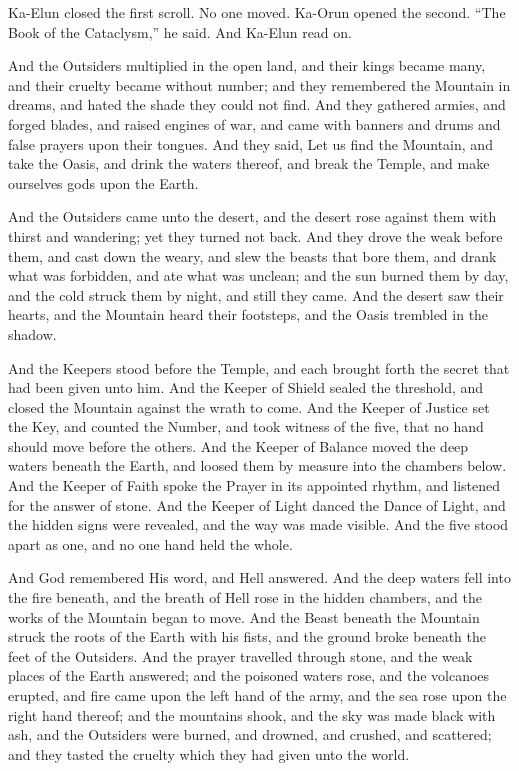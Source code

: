 Ka-Elun closed the first scroll. No one moved. Ka-Orun opened the second. ``The Book of the Cataclysm,'' he said. And Ka-Elun read on.\par
 
\begin{scripture}
And the Outsiders multiplied in the open land, and their kings became many, and their cruelty became without number; and they remembered the Mountain in dreams, and hated the shade they could not find.
And they gathered armies, and forged blades, and raised engines of war, and came with banners and drums and false prayers upon their tongues.
And they said, Let us find the Mountain, and take the Oasis, and drink the waters thereof, and break the Temple, and make ourselves gods upon the Earth.
\end{scripture}
 
\begin{scripture}
And the Outsiders came unto the desert, and the desert rose against them with thirst and wandering; yet they turned not back.
And they drove the weak before them, and cast down the weary, and slew the beasts that bore them, and drank what was forbidden, and ate what was unclean; and the sun burned them by day, and the cold struck them by night, and still they came.
And the desert saw their hearts, and the Mountain heard their footsteps, and the Oasis trembled in the shadow.
\end{scripture}
 
\begin{scripture}
And the Keepers stood before the Temple, and each brought forth the secret that had been given unto him.
And the Keeper of Shield sealed the threshold, and closed the Mountain against the wrath to come.
And the Keeper of Justice set the Key, and counted the Number, and took witness of the five, that no hand should move before the others.
And the Keeper of Balance moved the deep waters beneath the Earth, and loosed them by measure into the chambers below.
And the Keeper of Faith spoke the Prayer in its appointed rhythm, and listened for the answer of stone.
And the Keeper of Light danced the Dance of Light, and the hidden signs were revealed, and the way was made visible.
And the five stood apart as one, and no one hand held the whole.
\end{scripture}
 
\begin{scripture}
And God remembered His word, and Hell answered.
And the deep waters fell into the fire beneath, and the breath of Hell rose in the hidden chambers, and the works of the Mountain began to move.
And the Beast beneath the Mountain struck the roots of the Earth with his fists, and the ground broke beneath the feet of the Outsiders.
And the prayer travelled through stone, and the weak places of the Earth answered; and the poisoned waters rose, and the volcanoes erupted, and fire came upon the left hand of the army, and the sea rose upon the right hand thereof; and the mountains shook, and the sky was made black with ash, and the Outsiders were burned, and drowned, and crushed, and scattered; and they tasted the cruelty which they had given unto the world.
\end{scripture}
 
